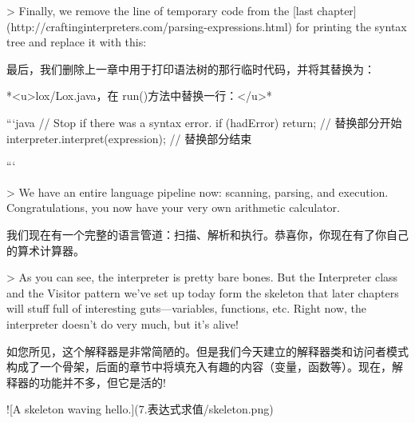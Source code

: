 \documentclass[cn,11pt,chinese]{elegantbook}
\begin{document}
{{{{> Finally, we remove the line of temporary code from the [last chapter](http://craftinginterpreters.com/parsing-expressions.html) for printing the syntax tree and replace it with this:

最后，我们删除上一章中用于打印语法树的那行临时代码，并将其替换为：

*<u>lox/Lox.java，在 run()方法中替换一行：</u>*

```java
    // Stop if there was a syntax error.
    if (hadError) return;
    // 替换部分开始
    interpreter.interpret(expression);
    // 替换部分结束
  }
```

> We have an entire language pipeline now: scanning, parsing, and execution. Congratulations, you now have your very own arithmetic calculator.

我们现在有一个完整的语言管道：扫描、解析和执行。恭喜你，你现在有了你自己的算术计算器。

> As you can see, the interpreter is pretty bare bones. But the Interpreter class and the Visitor pattern we’ve set up today form the skeleton that later chapters will stuff full of interesting guts—variables, functions, etc. Right now, the interpreter doesn’t do very much, but it’s alive!

如您所见，这个解释器是非常简陋的。但是我们今天建立的解释器类和访问者模式构成了一个骨架，后面的章节中将填充入有趣的内容（变量，函数等）。现在，解释器的功能并不多，但它是活的!

![A skeleton waving hello.](7.表达式求值/skeleton.png)



}}}
\end{document}
